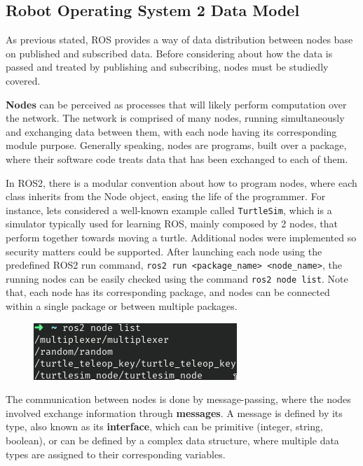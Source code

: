 \subsection{Robot Operating System 2 Data Model}

As previous stated, ROS provides a way of data distribution between nodes base on published and subscribed data. Before considering about how the data is passed and treated by publishing and subscribing, nodes must be studiedly covered.
            
\textbf{Nodes} can be perceived as processes that will likely perform computation over the network. The network is comprised of many nodes, running simultaneously and exchanging data between them, with each node having its corresponding module purpose. Generally speaking, nodes are programs, built over a package, where their software code treats data that has been exchanged to each of them.

In ROS2, there is a modular convention about how to program nodes, where each class inherits from the Node object, easing the life of the programmer.        
For instance, lets considered a well-known example called \texttt{TurtleSim}, which is a simulator typically used for learning ROS, mainly composed by 2 nodes, that perform together towards moving a turtle. Additional nodes were implemented so security matters could be supported. After launching each node using the predefined ROS2 run command, \texttt{ros2 run <package\_name> <node\_name>}, the running nodes can be easily checked using the command \texttt{ros2 node list}. Note that, each node has its corresponding package, and nodes can be connected within a single package or between multiple packages.

\begin{figure}[H]
        \centering
         \includegraphics[width=0.4\linewidth]{images/ts_nodelist.png}
\end{figure}
    
The communication between nodes is done by message-passing, where the nodes involved exchange information through \textbf{messages}. A message is defined by its type, also known as its \textbf{interface}, which can be primitive (integer, string, boolean), or can be defined by a complex data structure, where multiple data types are assigned to their corresponding variables.

